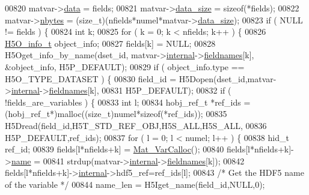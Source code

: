 \begin{DoxyCode}
00820     matvar->\hyperlink{group___m_a_t_a5672978efa230bbdecdf38ede781f7fa}{data} = fields;
00821     matvar->\hyperlink{group___m_a_t_a9ad1c82e2b568da617e12dc73a26e1f9}{data\_size} = \textcolor{keyword}{sizeof}(*fields);
00822     matvar->\hyperlink{group___m_a_t_abf1c844540503be2df9bb3db93cfe307}{nbytes}    = (size\_t)(nfields*numel*matvar->\hyperlink{group___m_a_t_a9ad1c82e2b568da617e12dc73a26e1f9}{data\_size});
00823     \textcolor{keywordflow}{if} ( NULL != fields ) \{
00824         \textcolor{keywordtype}{int} k;
00825         \textcolor{keywordflow}{for} ( k = 0; k < nfields; k++ ) \{
00826             \hyperlink{struct_h5_o__info__t}{H5O\_info\_t} object\_info;
00827             fields[k] = NULL;
00828             H5Oget\_info\_by\_name(dset\_id, matvar->\hyperlink{group___m_a_t_a6e97e3ed9f40c49322c18561c2a94e92}{internal}->\hyperlink{structmatvar__internal_a7574d000bfc98ad4860ae6590b8d4985}{fieldnames}[k], &object\_info, 
      H5P\_DEFAULT);
00829             \textcolor{keywordflow}{if} ( object\_info.type == H5O\_TYPE\_DATASET ) \{
00830                 field\_id = H5Dopen(dset\_id,matvar->\hyperlink{group___m_a_t_a6e97e3ed9f40c49322c18561c2a94e92}{internal}->\hyperlink{structmatvar__internal_a7574d000bfc98ad4860ae6590b8d4985}{fieldnames}[k],
00831                                    H5P\_DEFAULT);
00832                 \textcolor{keywordflow}{if} ( !fields\_are\_variables ) \{
00833                     \textcolor{keywordtype}{int} l;
00834                     hobj\_ref\_t *ref\_ids = (hobj\_ref\_t*)malloc((\textcolor{keywordtype}{size\_t})numel*\textcolor{keyword}{sizeof}(*ref\_ids));
00835                     H5Dread(field\_id,H5T\_STD\_REF\_OBJ,H5S\_ALL,H5S\_ALL,
00836                             H5P\_DEFAULT,ref\_ids);
00837                     \textcolor{keywordflow}{for} ( l = 0; l < numel; l++ ) \{
00838                         hid\_t ref\_id;
00839                         fields[l*nfields+k] = \hyperlink{group___m_a_t_gae7c9c3699f6e9c31a9c490300013098c}{Mat\_VarCalloc}();
00840                         fields[l*nfields+k]->\hyperlink{group___m_a_t_a5d4b55b041e3b4fb50c04337f05ad909}{name} =
00841                             strdup(matvar->\hyperlink{group___m_a_t_a6e97e3ed9f40c49322c18561c2a94e92}{internal}->\hyperlink{structmatvar__internal_a7574d000bfc98ad4860ae6590b8d4985}{fieldnames}[k]);
00842                         fields[l*nfields+k]->\hyperlink{group___m_a_t_a6e97e3ed9f40c49322c18561c2a94e92}{internal}->hdf5\_ref=ref\_ids[l];
00843                         \textcolor{comment}{/* Get the HDF5 name of the variable */}
00844                         name\_len = H5Iget\_name(field\_id,NULL,0);

\end{DoxyCode}
